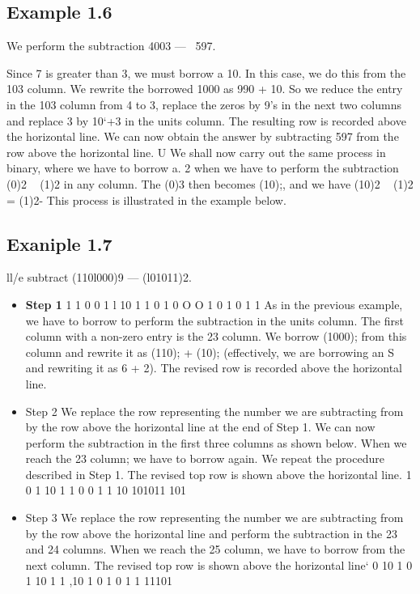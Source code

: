 \documentclass[12pt]{article}
\begin{document}
\subsection{Example 1.6} We perform the subtraction 4003 —~ 597.

Since 7 is greater than 3, we must borrow a 10. In this case, we do this from the 103 column. We
rewrite the borrowed 1000 as 990 + 10. So we reduce the entry in the 103 column from 4 to 3,
replace the zeros by 9’s in the next two columns and replace 3 by 10‘+3 in the units column. The
resulting row is recorded above the horizontal line. We can now obtain the answer by subtracting
597 from the row above the horizontal line. U
We shall now carry out the same process in binary, where we have to borrow a. 2 when we have to
perform the subtraction (0)2 ~ (1)2 in any column. The (0)3 then becomes (10);, and we have
(10)2 ~ (1)2 = (1)2-
This process is illustrated in the example below.
\subsection{Exaniple 1.7} ll/e subtract (110l000)9 — (l01011)2.
\begin{itemize}
    \item \textbf{Step 1}
1 1 0 0 1 l 10
1 1 0 1 0 O O
1 0 1 0 1 1
As in the previous example, we have to borrow to perform the subtraction in the units
column. The ﬁrst column with a non-zero entry is the 23 column. We borrow (1000); from
this column and rewrite it as (110); + (10); (effectively, we are borrowing an S and rewriting
it as 6 + 2). The revised row is recorded above the horizontal line.
\item Step 2 We replace the row representing the number we are subtracting from by the row above
the horizontal line at the end of Step 1. We can now perform the subtraction in the ﬁrst
three columns as shown below. When we reach the 23 column; we have to borrow again. We
repeat the procedure described in Step 1. The revised top row is shown above the horizontal
line.
1 0 1 10
1 1 0 0 1 1 10
101011
101
\item  Step 3 We replace the row representing the number we are subtracting from by the row above
the horizontal line and perform the subtraction in the 23 and 24 columns. When we reach
the 25 column, we have to borrow from the next column. The revised top row is shown above
the horizontal line‘
0 10
1 0 1 10 1 1 ,10
1 0 1 0 1 1
11101




\end{itemize}
\end{document}
